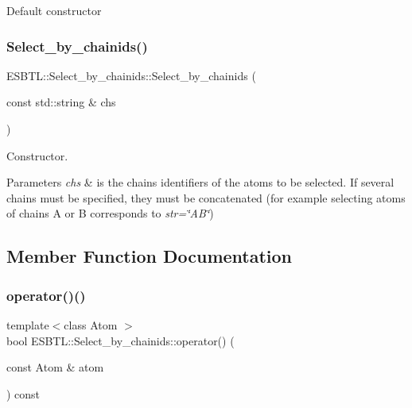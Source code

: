 Default constructor \mbox{\label{classESBTL_1_1Select__by__chainids_a742b7ffed9851414efd3b9439272cc96}} 
\subsubsection{\texorpdfstring{Select\+\_\+by\+\_\+chainids()}{Select\_by\_chainids()}\hspace{0.1cm}{\footnotesize\ttfamily [2/2]}}
{\footnotesize\ttfamily E\+S\+B\+T\+L\+::\+Select\+\_\+by\+\_\+chainids\+::\+Select\+\_\+by\+\_\+chainids (\begin{DoxyParamCaption}\item[{const std\+::string \&}]{chs }\end{DoxyParamCaption})\hspace{0.3cm}{\ttfamily [inline]}}

Constructor. 
\begin{DoxyParams}{Parameters}
{\em chs} & is the chains identifiers of the atoms to be selected. If several chains must be specified, they must be concatenated (for example selecting atoms of chains A or B corresponds to {\itshape str=\char`\"{}\+A\+B\char`\"{}}) \\
\hline
\end{DoxyParams}


\subsection{Member Function Documentation}
\mbox{\label{classESBTL_1_1Select__by__chainids_ad59b92cc3d2e8a5b07f8f005aff10c47}} 
\subsubsection{\texorpdfstring{operator()()}{operator()()}}
{\footnotesize\ttfamily template$<$class Atom $>$ \\
bool E\+S\+B\+T\+L\+::\+Select\+\_\+by\+\_\+chainids\+::operator() (\begin{DoxyParamCaption}\item[{const Atom \&}]{atom }\end{DoxyParamCaption}) const\hspace{0.3cm}{\ttfamily [inline]}}

